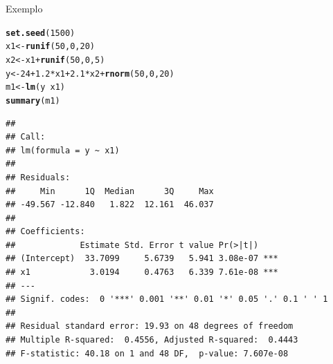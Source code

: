 \documentclass{beamer}\usepackage[]{graphicx}\usepackage[]{color}
\makeatletter
\newcommand{\hlnum}[1]{\textcolor[rgb]{0.686,0.059,0.569}{#1}}%
\newcommand{\hlopt}[1]{\textcolor[rgb]{0,0,0}{#1}}%
\newcommand{\hlstd}[1]{\textcolor[rgb]{0.345,0.345,0.345}{#1}}%
\newcommand{\hlkwb}[1]{\textcolor[rgb]{0.69,0.353,0.396}{#1}}%
\newcommand{\hlkwd}[1]{\textcolor[rgb]{0.737,0.353,0.396}{\textbf{#1}}}%
\newenvironment{kframe}{%
 \def\at@end@of@kframe{}%
 \ifinner\ifhmode%
  \def\at@end@of@kframe{\end{minipage}}%
  \begin{minipage}{\columnwidth}%
 \fi\fi%
 \def\FrameCommand##1{\hskip\@totalleftmargin \hskip-\fboxsep
 \colorbox{shadecolor}{##1}\hskip-\fboxsep
     \hskip-\linewidth \hskip-\@totalleftmargin \hskip\columnwidth}%
 \MakeFramed {\advance\hsize-\width
   \@totalleftmargin\z@ \linewidth\hsize
   \@setminipage}}%
 {\par\unskip\endMakeFramed%
 \at@end@of@kframe}
\newenvironment{knitrout}{}{} %
\renewenvironment{knitrout}{\setlength{\topsep}{0mm}}{}
\makeatother
\begin{document}
\begin{frame}[fragile]{Exemplo}

\begin{knitrout}\tiny
{}\color{fgcolor}\begin{kframe}
\begin{alltt}
\hlkwd{set.seed}\hlstd{(}\hlnum{1500}\hlstd{)}
\hlstd{x1} \hlkwb{<-} \hlkwd{runif}\hlstd{(}\hlnum{50}\hlstd{,}\hlnum{0}\hlstd{,}\hlnum{20}\hlstd{)}
\hlstd{x2} \hlkwb{<-} \hlstd{x1} \hlopt{+} \hlkwd{runif}\hlstd{(}\hlnum{50}\hlstd{,}\hlnum{0}\hlstd{,}\hlnum{5}\hlstd{)}
\hlstd{y} \hlkwb{<-} \hlnum{24} \hlopt{+} \hlnum{1.2} \hlopt{*}\hlstd{x1} \hlopt{+} \hlnum{2.1}\hlopt{*}\hlstd{x2} \hlopt{+} \hlkwd{rnorm}\hlstd{(}\hlnum{50}\hlstd{,}\hlnum{0}\hlstd{,}\hlnum{20}\hlstd{)}
\hlstd{m1} \hlkwb{<-} \hlkwd{lm}\hlstd{(y} \hlopt{~} \hlstd{x1)}
\hlkwd{summary}\hlstd{(m1)}
\end{alltt}
\begin{verbatim}
## 
## Call:
## lm(formula = y ~ x1)
## 
## Residuals:
##     Min      1Q  Median      3Q     Max 
## -49.567 -12.840   1.822  12.161  46.037 
## 
## Coefficients:
##             Estimate Std. Error t value Pr(>|t|)    
## (Intercept)  33.7099     5.6739   5.941 3.08e-07 ***
## x1            3.0194     0.4763   6.339 7.61e-08 ***
## ---
## Signif. codes:  0 '***' 0.001 '**' 0.01 '*' 0.05 '.' 0.1 ' ' 1
## 
## Residual standard error: 19.93 on 48 degrees of freedom
## Multiple R-squared:  0.4556,	Adjusted R-squared:  0.4443 
## F-statistic: 40.18 on 1 and 48 DF,  p-value: 7.607e-08
\end{verbatim}
\end{kframe}
\end{knitrout}


\end{frame}
\end{document}
